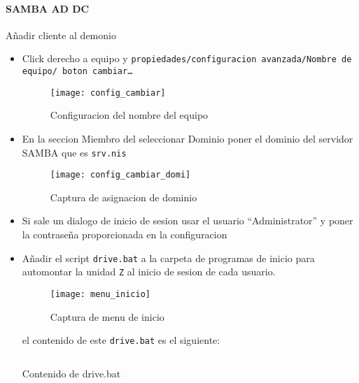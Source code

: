 \documentclass[../main.tex]{subfiles}
\begin{document}
\paragraph{SAMBA AD DC}

Añadir cliente al demonio
\begin{itemize}
  \item Click derecho a equipo y \texttt{propiedades/configuracion avanzada/Nombre de equipo/ boton cambiar\ldots}
        \begin{figure}[H]
          \centering
          \texttt{[image: config\_cambiar]}
          \caption{Configuracion del nombre del equipo}\label{fig:config_cambiar}
        \end{figure}
        \newpage{}

  \item En la seccion Miembro del seleccionar Dominio poner el dominio del servidor SAMBA que es \texttt{srv.nis}
        \begin{figure}[H]
          \centering
          \texttt{[image: config\_cambiar\_domi]}
          \caption{Captura de asignacion de dominio}\label{fig:config_cambiar_domi}
        \end{figure}
        \newpage{}
  \item Si sale un dialogo de inicio de sesion usar el usuario ``Administrator''
        y poner la contraseña proporcionada en la configuracion
  \item Añadir el script \texttt{drive.bat} a la carpeta de programas
        de inicio para automontar la unidad \texttt{Z} al inicio de sesion de
        cada usuario.
        \begin{figure}[H]
          \centering
          \texttt{[image: menu\_inicio]}
          \caption{Captura de menu de inicio}\label{fig:menu_inicio}
        \end{figure}

        el contenido de este \texttt{drive.bat} es el siguiente:


        \begin{listing}[H]
          \inputminted{bat}{../configs/drive.bat}
          \caption{Contenido de drive.bat}
          \label{listing:drive.sh}
        \end{listing}



\end{itemize}
\end{document}

